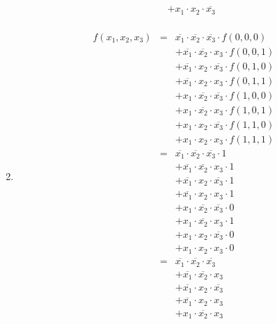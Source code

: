 \documentclass[DIN, pagenumber=false, fontsize=11pt, parskip=half]{scrartcl}
\begin{document}
\begin{enumerate}[label=(\alph*)]
\begin{eqnarray*}
                &&+ x_1 \cdot x_2 \cdot \overline{x_3} \\
            \end{eqnarray*}
        \item
            \begin{eqnarray*}
                f(x_1, x_2, x_3) &=& \overline{x_1} \cdot \overline{x_2} \cdot \overline{x_3} \cdot f(0,0,0) \\
                &&+ \overline{x_1} \cdot \overline{x_2} \cdot x_3 \cdot f(0,0,1) \\
                &&+ \overline{x_1} \cdot x_2 \cdot \overline{x_3} \cdot f(0,1,0) \\
                &&+ \overline{x_1} \cdot x_2 \cdot x_3 \cdot f(0,1,1) \\
                &&+ x_1 \cdot \overline{x_2} \cdot \overline{x_3} \cdot f(1,0,0) \\
                &&+ x_1 \cdot \overline{x_2} \cdot x_3 \cdot f(1,0,1) \\
                &&+ x_1 \cdot x_2 \cdot \overline{x_3} \cdot f(1,1,0) \\
                &&+ x_1 \cdot x_2 \cdot x_3 \cdot f(1,1,1) \\
                &=& \overline{x_1} \cdot \overline{x_2} \cdot \overline{x_3} \cdot 1 \\
                &&+ \overline{x_1} \cdot \overline{x_2} \cdot x_3 \cdot 1 \\
                &&+ \overline{x_1} \cdot x_2 \cdot \overline{x_3} \cdot 1 \\
                &&+ \overline{x_1} \cdot x_2 \cdot x_3 \cdot 1 \\
                &&+ x_1 \cdot \overline{x_2} \cdot \overline{x_3} \cdot 0 \\
                &&+ x_1 \cdot \overline{x_2} \cdot x_3 \cdot 1 \\
                &&+ x_1 \cdot x_2 \cdot \overline{x_3} \cdot 0 \\
                &&+ x_1 \cdot x_2 \cdot x_3 \cdot 0 \\
                &=& \overline{x_1} \cdot \overline{x_2} \cdot \overline{x_3} \\
                &&+ \overline{x_1} \cdot \overline{x_2} \cdot x_3 \\
                &&+ \overline{x_1} \cdot x_2 \cdot \overline{x_3} \\
                &&+ \overline{x_1} \cdot x_2 \cdot x_3\\
                &&+ x_1 \cdot \overline{x_2} \cdot x_3 \\
            \end{eqnarray*}
    \end{enumerate}
\end{document}
